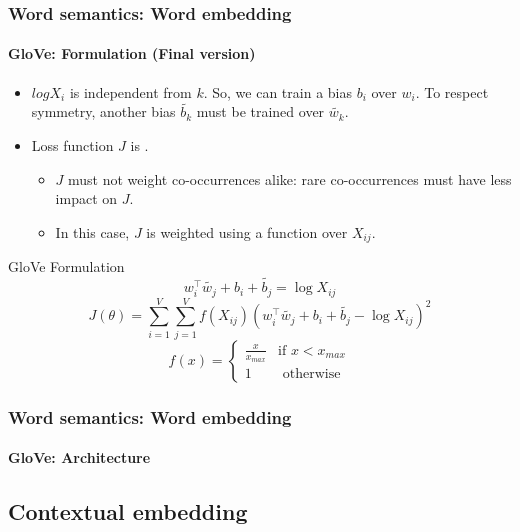 \documentclass[xcolor=table]{beamer}
\begin{document}
\begin{frame}
\frametitle{Word semantics: Word embedding}
\framesubtitle{GloVe: Formulation (Final version)}
	
\begin{itemize}
	\item $log X_i$ is independent from $k$. 
	So, we can train a bias $b_i$ over $w_i$. 
	To respect symmetry, another bias $\tilde{b_k}$ must be trained over $\tilde{w_k}$.
	\item Loss function $J$ is .
	\begin{itemize}
		\item $J$ must not weight co-occurrences alike: rare co-occurrences must have less impact on $J$.
		\item In this case, $J$ is weighted using a function over $X_{ij}$.
	\end{itemize}
\end{itemize}

\vskip-2pt\begin{block}{GloVe Formulation}\vskip-2pt
	\[w_i^\top \tilde{w_j} + b_i + \tilde{b_j} = \log X_{ij} \]
	\[J(\theta) = \sum_{i=1}^{V} \sum_{j=1}^{V} f(X_{ij}) (w_i^\top \tilde{w_j} + b_i + \tilde{b_j} - \log X_{ij})^2\]
	\vskip-2pt\[f(x) = \begin{cases}
	\frac{x}{x_{max}} & \text{if } x < x_{max} \\
	1 & \text{ otherwise}
	\end{cases}\]
\end{block}
	
\end{frame}

\begin{frame}
\frametitle{Word semantics: Word embedding}
\framesubtitle{GloVe: Architecture}
	
\begin{center}
\end{center}
	
\end{frame}

\subsection{Contextual embedding}
\end{document}
